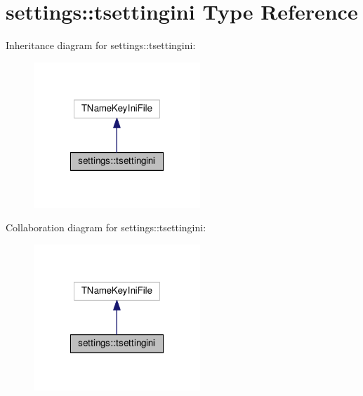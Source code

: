 \hypertarget{structsettings_1_1tsettingini}{}\section{settings\+:\+:tsettingini Type Reference}
\label{structsettings_1_1tsettingini}


Inheritance diagram for settings\+:\+:tsettingini\+:
\nopagebreak
\begin{figure}[H]
\begin{center}
\leavevmode
\includegraphics[width=178pt]{structsettings_1_1tsettingini__inherit__graph}
\end{center}
\end{figure}


Collaboration diagram for settings\+:\+:tsettingini\+:
\nopagebreak
\begin{figure}[H]
\begin{center}
\leavevmode
\includegraphics[width=178pt]{structsettings_1_1tsettingini__coll__graph}
\end{center}
\end{figure}

